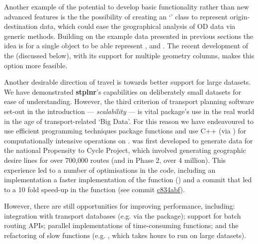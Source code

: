 Another example of the potential to develop basic functionality rather than new advanced features is the the possibility of creating an `' class to represent origin-destination data, which could ease the geographical analysis of OD data via generic methods.
Building on the example data presented in previous sections the idea is for a single  object to be able represent ,  and .
The recent development of the  (discussed below), with its support for multiple geometry columns, makes this option more feasible.

Another desirable direction of travel is towards better support for large datasets.
We have demonstrated \textbf{stplnr}'s capabilities on deliberately small datasets for ease of understanding.
However, the third criterion of transport planning software set-out in the introduction --- \emph{scalability} --- is vital package's use in the real world in the age of transport-related `Big Data'.
For this reason we have endeavoured to use efficient programming techniques package functions and use C++ (via ) for computationally intensive operations on .
 was first developed to generate data for the national
Propensity to Cycle Project, which involved generating geographic desire lines for over 700,000 routes \citep{lovelace_propensity_2017} (and in Phase 2, over 4 million).
This experience led to a number of optimisations in the code, including an implementation a faster implementation of the  function () and a commit that led to a 10 fold speed-up in the  function (see commit \href{https://github.com/ropensci/stplanr/commit/c834abf7d0020c6fbb33845572d6be4801f31f47}{c834abf}).

However, there are still opportunities for improving performance, including:
integration with transport databases (e.g. via the  package);
support for batch routing APIs;
parallel implementations of time-consuming functions;
and the refactoring of slow functions (e.g. , which takes hours to run on large datasets).



